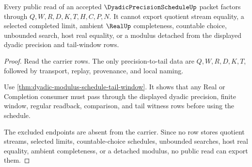 \begin{theorem}
\label{thm:dyadic-modulus-schedule-nonescape}
Every public read of an accepted $\DyadicPrecisionScheduleUp$ packet factors through $Q,W,R,D,K,T,H,C,P,N$. It cannot export quotient stream equality, a selected completed limit, ambient $\RealUp$ completeness, countable choice, unbounded search, host real equality, or a modulus detached from the displayed dyadic precision and tail-window rows.
\end{theorem}
\begin{proof}
Read the carrier rows. The only precision-to-tail data are $Q,W,R,D,K,T$, followed by transport, replay, provenance, and local naming.

Use \autoref{thm:dyadic-modulus-schedule-tail-window}. It shows that any Real or Completion consumer must pass through the displayed dyadic precision, finite window, regular readback, comparison, and tail witness rows before using the schedule.

The excluded endpoints are absent from the carrier. Since no row stores quotient streams, selected limits, countable-choice schedules, unbounded searches, host real equality, ambient completeness, or a detached modulus, no public read can export them.
\end{proof}




